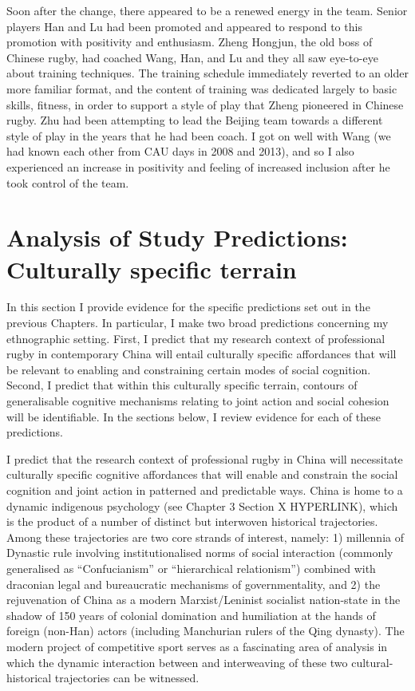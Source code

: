 \begin{CJK}{UTF8}{gbsn}
Soon after the change, there appeared to be a renewed energy in the team.  Senior players Han and Lu had been promoted and appeared to respond to this promotion with positivity and enthusiasm.  Zheng Hongjun, the old boss of Chinese rugby, had coached Wang, Han, and Lu and they all saw eye-to-eye about training techniques.  The training schedule immediately reverted to an older more familiar format, and the content of training was dedicated largely to basic skills, fitness, in order to support a style of play that Zheng pioneered in Chinese rugby.  Zhu had been attempting to lead the Beijing team towards a different style of play in the years that he had been coach.  I got on well with Wang (we had known each other from CAU days in 2008 and 2013), and so I also experienced an increase in positivity and feeling of increased inclusion after he took control of the team.







\section{Analysis of Study Predictions: Culturally specific terrain}

In this section I provide evidence for the specific predictions set out in the previous Chapters.  In particular, I make two broad predictions concerning my ethnographic setting.  First, I predict that my research context of professional rugby in contemporary China will entail culturally specific affordances that will be relevant to enabling and constraining certain modes of social cognition.  Second, I predict that within this culturally specific terrain, contours of generalisable cognitive mechanisms relating to joint action and social cohesion will be identifiable.  In the sections below, I review evidence for each of these predictions.

I predict that the research context of professional rugby in China will necessitate culturally specific cognitive affordances that will enable and constrain the social cognition and joint action in patterned and predictable ways.  China is home to a dynamic indigenous psychology (see Chapter 3 Section X HYPERLINK), which is the product of a number of distinct but interwoven historical trajectories.  Among these trajectories are two core strands of interest, namely: 1) millennia of Dynastic rule involving institutionalised norms of social interaction (commonly generalised as ``Confucianism'' or ``hierarchical relationism'') combined with draconian legal and bureaucratic mechanisms of governmentality, and 2) the rejuvenation of China as a modern Marxist/Leninist socialist nation-state in the shadow of 150 years of colonial domination and humiliation at the hands of foreign (non-Han) actors (including Manchurian rulers of the Qing dynasty).  The modern project of competitive sport serves as a fascinating area of analysis in which the dynamic interaction between and interweaving of these two cultural-historical trajectories can be witnessed.


\end{CJK}
